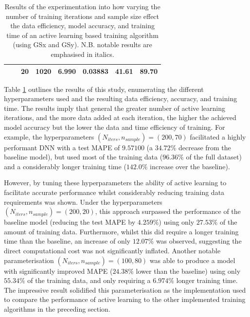 \documentclass[a4paper, 11pt]{report}
\begin{document}
\begin{table}[ht]
\begin{tabular}{|l|l|l|l|l|l|l|l|}
        \cline{3-8}
                                                                                &                                                                                 & 20                                                                     & 1020                                                                       & 6.990                                                                                             & 0.03883          & 41.61          & 89.70                                                                       \\
        \hline
        \end{tabular}
        \caption{\centering Results of the experimentation into how varying the number of training iterations and sample size effect the data efficiency, model accuracy, and training time of an active learning based training algorithm (using GSx and GSy). N.B. notable results are emphasised in italics.}
        \label{table: al-efficiency}
    \end{table}


    Table \ref{table: al-efficiency} outlines the results of this study, enumerating the different hyperparameters used and the resulting data efficiency, accuracy, and training time. The results imply that general the greater number of active learning iterations, and the more data added at each iteration, the higher the achieved model accuracy but the lower the data and time efficiency of training. For example, the hyperparameters $(N_{iters}, n_{sample}) = (200, 70)$ facilitated a highly performant DNN with a test MAPE of $9.57100$ (a $34.72\%$ decrease from the baseline model), but used most of the training data ($96.36\%$ of the full dataset) and a considerably longer training time ($142.0\%$ increase over the baseline).

    However, by tuning these hyperparameters the ability of active learning to facilitate accurate performance whilst considerably reducing training data requirements was shown. Under the hyperparameters $(N_{iters}, n_{sample}) = (200, 20)$, this approach surpassed the performance of the baseline model (reducing the test MAPE by $4.259\%$) using only $27.53\%$ of the amount of training data. Furthermore, whilst this did require a longer training time than the baseline, an increase of only $12.07\%$ was observed, suggesting the direct computational cost was not significantly inflated. Another notable parameterisation $(N_{iters}, n_{sample}) = (100, 80)$ was able to produce a model with significantly improved MAPE ($24.38\%$ lower than the baseline) using only $55.34\%$ of the training data, and only requiring a $6.974\%$ longer training time. The impressive result solidified this parameterisation as the implementation used to compare the performance of active learning to the other implemented training algorithms in the preceding section.
\end{document}
